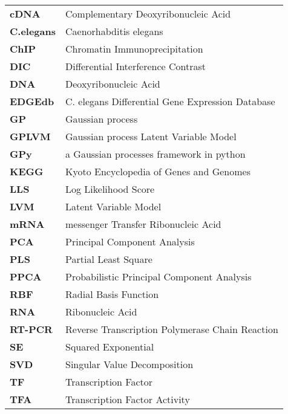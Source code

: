 \begin{table}[!htbp]
\renewcommand{\arraystretch}{1.3}
\begin{tabular}{l | l }
      \textbf{cDNA} & {Complementary Deoxyribonucleic Acid}\\
      \textbf{C.elegans} & {Caenorhabditis elegans} \\
      \textbf{ChIP} & {Chromatin Immunoprecipitation} \\
      \textbf{DIC} & {Differential Interference Contrast}\\ 
      \textbf{DNA} & {Deoxyribonucleic Acid} \\
      \textbf{EDGEdb} & {C. elegans Differential Gene Expression Database} \\
      \textbf{GP} & {Gaussian process} \\
      \textbf{GPLVM} & {Gaussian process Latent Variable Model} \\
      \textbf{GPy} & {a Gaussian processes framework in python} \\
      \textbf{KEGG} & {Kyoto Encyclopedia of Genes and Genomes} \\
      \textbf{LLS} & {Log Likelihood Score} \\
      \textbf{LVM} & {Latent Variable Model} \\
      \textbf{mRNA} & {messenger Transfer Ribonucleic Acid} \\
      \textbf{PCA} & {Principal Component Analysis}\\
      \textbf{PLS} & {Partial Least Square} \\
      \textbf{PPCA} & {Probabilistic Principal Component Analysis}\\
      \textbf{RBF} & {Radial Basis Function} \\
      \textbf{RNA} & {Ribonucleic Acid}\\
      \textbf{RT-PCR} & {Reverse Transcription Polymerase Chain Reaction} \\ %
      \textbf{SE} & {Squared Exponential} \\
      \textbf{SVD} & {Singular Value Decomposition} \\
      \textbf{TF} & {Transcription Factor} \\
      \textbf{TFA} & {Transcription Factor Activity} \\
  \end{tabular}
\end{table}


